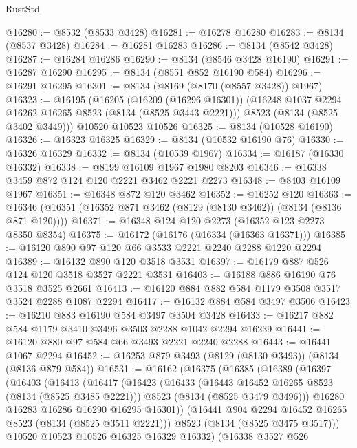 \begin{lexlean}{RustStd}
\begin{coremodule}
{\begin{coremodule}
{{{{{{{{{{{{{{{{{{{{{{{{{{{{{{{{{{{{{{{{{{{{{{{{{{{{{@16280 := @8532 (@8533 @3428)
@16281 := @16278 @16280
@16283 := @8134 (@8537 @3428)
@16284 := @16281 @16283
@16286 := @8134 (@8542 @3428)
@16287 := @16284 @16286
@16290 := @8134 (@8546 @3428 @16190)
@16291 := @16287 @16290
@16295 := @8134 (@8551 @852 @16190 @584)
@16296 := @16291 @16295
@16301 := @8134 (@8169 (@8170 (@8557 @3428)) @1967)
@16323 := @16195
    (@16205
      (@16209 (@16296 @16301))
      (@16248 @1037 @2294 @16262 @16265 @8523 (@8134 (@8525 @3443 @2221)))
      @8523
      (@8134 (@8525 @3402 @3449)))
    @10520
    @10523
    @10526
@16325 := @8134 (@10528 @16190)
@16326 := @16323 @16325
@16329 := @8134 (@10532 @16190 @76)
@16330 := @16326 @16329
@16332 := @8134 (@10539 @1967)
@16334 := @16187 (@16330 @16332)
@16338 := @8199 @16109 @1967 @1980 @8203
@16346 := @16338 @3459 @872 @124 @120 @2221 @3462 @2221 @2273
@16348 := @8403 @16109 @1967
@16351 := @16348 @872 @120 @3462
@16352 := @16252 @120
@16363 := @16346 (@16351 (@16352 @871 @3462 (@8129 (@8130 @3462)) (@8134 (@8136 @871 @120))))
@16371 := @16348 @124 @120 @2273 (@16352 @123 @2273 @8350 @8354)
@16375 := @16172 (@16176 (@16334 (@16363 @16371)))
@16385 := @16120 @890 @97 @120 @66 @3533 @2221 @2240 @2288 @1220 @2294
@16389 := @16132 @890 @120 @3518 @3531
@16397 := @16179 @887 @526 @124 @120 @3518 @3527 @2221 @3531
@16403 := @16188 @886 @16190 @76 @3518 @3525 @2661
@16413 := @16120 @884 @882 @584 @1179 @3508 @3517 @3524 @2288 @1087 @2294
@16417 := @16132 @884 @584 @3497 @3506
@16423 := @16210 @883 @16190 @584 @3497 @3504 @3428
@16433 := @16217 @882 @584 @1179 @3410 @3496 @3503 @2288 @1042 @2294 @16239
@16441 := @16120 @880 @97 @584 @66 @3493 @2221 @2240 @2288
@16443 := @16441 @1067 @2294
@16452 := @16253 @879 @3493 (@8129 (@8130 @3493)) (@8134 (@8136 @879 @584))
@16531 := @16162
    (@16375
      (@16385
        (@16389
          (@16397
            (@16403
              (@16413
                (@16417
                  (@16423
                    (@16433
                      (@16443 @16452 @16265 @8523 (@8134 (@8525 @3485 @2221)))
                      @8523
                      (@8134 (@8525 @3479 @3496)))
                    @16280
                    @16283
                    @16286
                    @16290
                    @16295
                    @16301))
                (@16441 @904 @2294 @16452 @16265 @8523 (@8134 (@8525 @3511 @2221)))
                @8523
                (@8134 (@8525 @3475 @3517)))
              @10520
              @10523
              @10526
              @16325
              @16329
              @16332)
            (@16338
              @3527
              @526
}}}}}}}}}}}}}}}}}}}}}}}}}}}}}}}}}}}}}}}}}}}}}}}}}}}}}
\end{coremodule}}
\end{coremodule}
\end{lexlean}
